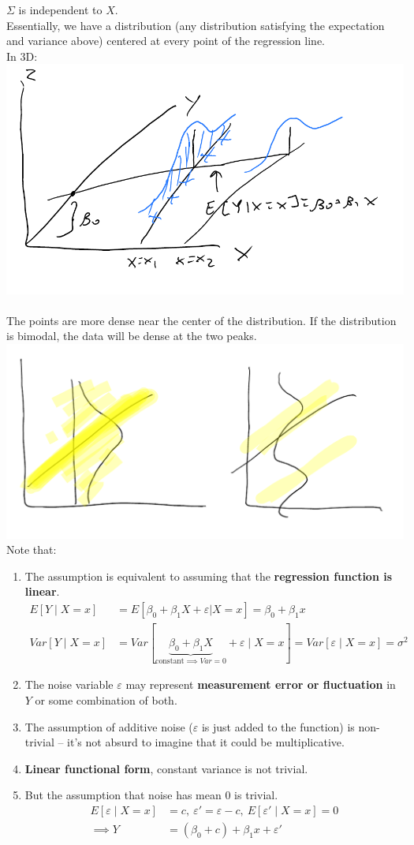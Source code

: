 \documentclass[12 pt]{article}
\begin{document}
$\Sigma$ is independent to $X$.
\\ Essentially, we have a distribution (any distribution satisfying
the expectation and variance above) centered at every point
of the regression line.
\\ In 3D:
\\\includegraphics[width=.5\textwidth]{7.pdf}
\\
\\ The points are more dense near the center of the distribution. If
the distribution is bimodal, the data will be dense at the two peaks.
\\ \includegraphics[width=.9\textwidth]{8.pdf}
\\
Note that:
\begin{enumerate}
\item The assumption is equivalent to assuming that the
  \textbf{regression function is linear}.
  \begin{align*}
  E[Y \mid X = x] & = E [\beta_0 + \beta_1 X + \varepsilon | X = x] =
                    \beta_0 + \beta_1x
    \\ Var[Y \mid X = x] & = Var[\underbrace{\beta_0+\beta_1X}_{\text{constant} \implies Var = 0} + \varepsilon \mid X = x ] = Var[\varepsilon \mid X = x] = \sigma^2
  \end{align*}
\item The noise variable $\varepsilon$ may represent
  \textbf{measurement error or fluctuation} in $Y$ or some combination
  of both.
\item The assumption of additive noise ($\varepsilon$ is just added to
  the function) is non-trivial \hbox{--} it's
  not absurd to imagine that it could be multiplicative.
\item \textbf{Linear functional form}, constant variance is not
  trivial.
\item But the assumption that noise has mean $0$ is trivial.
  \begin{align*}
    E [\varepsilon \mid X = x] & = c,\ \varepsilon' = \varepsilon - c,\ E[\varepsilon' \mid X = x] = 0
    \\ \implies Y & = (\beta_0 + c) + \beta_1 x + \varepsilon'
  \end{align*}
\end{enumerate}
\end{document}
